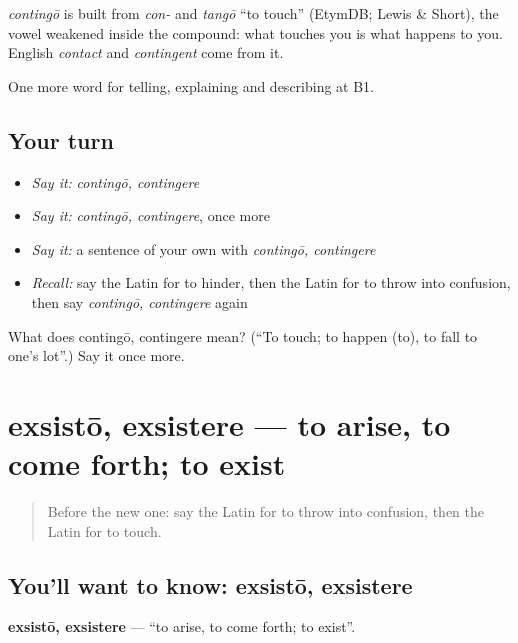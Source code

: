 \begin{cousinweb}
\emph{contingō} is built from \emph{con-} and \emph{tangō} \textquotedblleft{}to touch\textquotedblright{} (EtymDB; Lewis \& Short), the vowel weakened inside the compound: what touches you is what happens to you. English \emph{contact} and \emph{contingent} come from it.
\end{cousinweb}

\begin{grammarlens}[title={What you've built}]
One more word for telling, explaining and describing at B1.
\end{grammarlens}

\subsection*{Your turn}
\begin{itemize}
\raggedright
  \item \emph{Say it:} \emph{contingō, contingere}
  \item \emph{Say it:} \emph{contingō, contingere}, once more
  \item \emph{Say it:} a sentence of your own with \emph{contingō, contingere}
  \item \emph{Recall:} say the Latin for to hinder, then the Latin for to throw into confusion, then say \emph{contingō, contingere} again
\end{itemize}

\begin{tcolorbox}[breakable,colback=teal!4,colframe=teal!35!black,title={Before you move on}]
What does contingō, contingere mean? (\textquotedblleft{}To touch; to happen (to), to fall to one's lot\textquotedblright{}.) Say it once more.
\end{tcolorbox}
\section[exsistō, exsistere]{exsistō, exsistere — to arise, to come forth; to exist}

\label{lesson:LA-C375-exsisto}



\begin{quote}
Before the new one: say the Latin for to throw into confusion, then the Latin for to touch.
\end{quote}

\subsection*{You'll want to know: exsistō, exsistere}
\textbf{exsistō, exsistere} — \textquotedblleft{}to arise, to come forth; to exist\textquotedblright{}.

